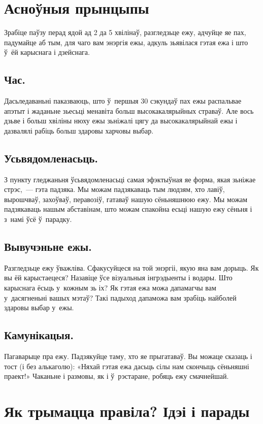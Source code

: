 \section{Асноўныя прынцыпы}

Зрабіце паўзу перад ядой ад 2 да 5 хвілінаў, разгледзьце ежу, адчуйце яе пах, падумайце аб тым, для чаго вам энэргія ежы, адкуль зьявілася гэтая ежа і што ў~ёй карыснага і дзейснага.

\subsection{Час.}
Дасьледаваньні паказваюць, што ў~першыя 30 сэкундаў пах ежы распальвае апэтыт і жаданьне зьесьці менавіта больш высокакалярыйных страваў. Але вось дзьве і больш хвіліны нюху ежы зьніжалі цягу да высокакалярыйнай ежы і дазвалялі рабіць больш здаровы харчовы выбар.

\subsection{Усьвядомленасьць.}
З пункту гледжаньня ўсьвядомленасьці самая эфэктыўная яе форма, якая зьніжае стрэс,~--- гэта падзяка. Мы можам падзякаваць тым людзям, хто лавіў, вырошчваў, захоўваў, перавозіў, гатаваў нашую сёньняшнюю ежу. Мы можам падзякаваць нашым абставінам, што можам спакойна есьці нашую ежу сёньня і з~намі ўсё ў~парадку.

\subsection{Вывучэньне ежы.}
Разгледзьце ежу ўважліва. Сфакусуйцеся на той энэргіі, якую яна вам дорыць. Як вы ёй карыстаецеся? Назавіце ўсе візуальныя інгрэдыенты і водары. Што карыснага ёсьць у~кожным зь іх? Як гэтая ежа можа дапамагчы вам у~дасягненьні вашых мэтаў? Такі падыход дапаможа вам зрабіць найболей здаровы выбар у~ежы.

\subsection{Камунікацыя.}
Пагаварыце пра ежу. Падзякуйце таму, хто яе прыгатаваў. Вы можаце сказаць і тост (і без алькаголю): «Няхай гэтая ежа дасьць сілы нам скончыць сёньняшні праект!» Чаканьне і размовы, як і ў~рэстаране, робяць ежу смачнейшай.

\section{Як трымацца правіла? Ідэі і парады}

